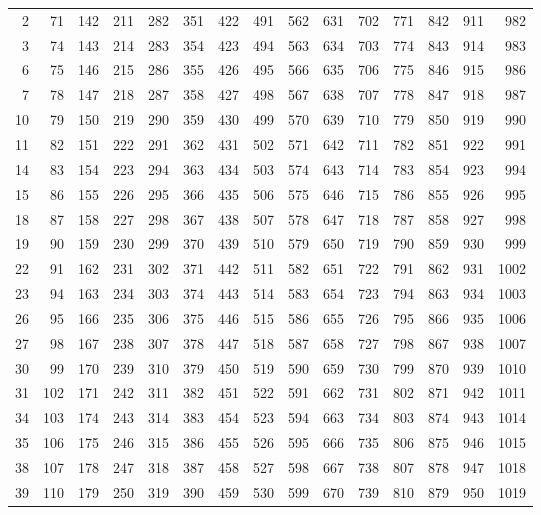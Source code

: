 \documentclass{assignment}
\begin{document}
\begin{tabular}{r r r r r r r r r r r r r r r}
2 & 71 & 142 & 211 & 282 & 351 & 422 & 491 & 562 & 631 & 702 & 771 & 842 & 911 & 982 \\
3 & 74 & 143 & 214 & 283 & 354 & 423 & 494 & 563 & 634 & 703 & 774 & 843 & 914 & 983 \\
6 & 75 & 146 & 215 & 286 & 355 & 426 & 495 & 566 & 635 & 706 & 775 & 846 & 915 & 986 \\
7 & 78 & 147 & 218 & 287 & 358 & 427 & 498 & 567 & 638 & 707 & 778 & 847 & 918 & 987 \\
10 & 79 & 150 & 219 & 290 & 359 & 430 & 499 & 570 & 639 & 710 & 779 & 850 & 919 & 990 \\
11 & 82 & 151 & 222 & 291 & 362 & 431 & 502 & 571 & 642 & 711 & 782 & 851 & 922 & 991 \\
14 & 83 & 154 & 223 & 294 & 363 & 434 & 503 & 574 & 643 & 714 & 783 & 854 & 923 & 994 \\
15 & 86 & 155 & 226 & 295 & 366 & 435 & 506 & 575 & 646 & 715 & 786 & 855 & 926 & 995 \\
18 & 87 & 158 & 227 & 298 & 367 & 438 & 507 & 578 & 647 & 718 & 787 & 858 & 927 & 998 \\
19 & 90 & 159 & 230 & 299 & 370 & 439 & 510 & 579 & 650 & 719 & 790 & 859 & 930 & 999 \\
22 & 91 & 162 & 231 & 302 & 371 & 442 & 511 & 582 & 651 & 722 & 791 & 862 & 931 & 1002 \\
23 & 94 & 163 & 234 & 303 & 374 & 443 & 514 & 583 & 654 & 723 & 794 & 863 & 934 & 1003 \\
26 & 95 & 166 & 235 & 306 & 375 & 446 & 515 & 586 & 655 & 726 & 795 & 866 & 935 & 1006 \\
27 & 98 & 167 & 238 & 307 & 378 & 447 & 518 & 587 & 658 & 727 & 798 & 867 & 938 & 1007 \\
30 & 99 & 170 & 239 & 310 & 379 & 450 & 519 & 590 & 659 & 730 & 799 & 870 & 939 & 1010 \\
31 & 102 & 171 & 242 & 311 & 382 & 451 & 522 & 591 & 662 & 731 & 802 & 871 & 942 & 1011 \\
34 & 103 & 174 & 243 & 314 & 383 & 454 & 523 & 594 & 663 & 734 & 803 & 874 & 943 & 1014 \\
35 & 106 & 175 & 246 & 315 & 386 & 455 & 526 & 595 & 666 & 735 & 806 & 875 & 946 & 1015 \\
38 & 107 & 178 & 247 & 318 & 387 & 458 & 527 & 598 & 667 & 738 & 807 & 878 & 947 & 1018 \\
39 & 110 & 179 & 250 & 319 & 390 & 459 & 530 & 599 & 670 & 739 & 810 & 879 & 950 & 1019 \\

\end{tabular}
\end{document}
